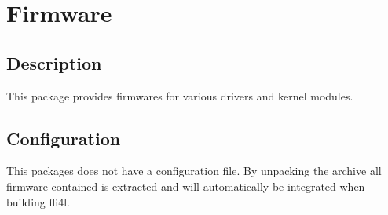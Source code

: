 {
\section {Firmware}
}

\subsection {Description}
  This package provides firmwares for various drivers and kernel modules.\\

\subsection{Configuration}

  This packages does not have a configuration file. By unpacking the archive all firmware
  contained is extracted and will automatically be integrated when building fli4l.
